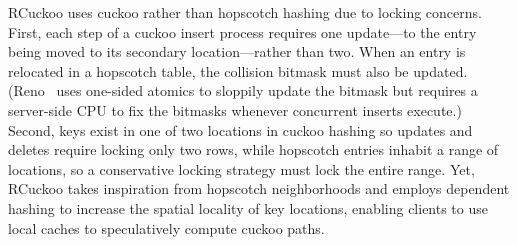 RCuckoo uses cuckoo rather than hopscotch hashing due to locking
concerns.
First, each step of a cuckoo insert process requires one update---to
the entry being moved to its secondary location---rather than two.
When an entry is relocated in a hopscotch table, the collision bitmask
must also be updated.  (Reno~\cite{reno} uses one-sided atomics to
sloppily update the bitmask but requires a server-side CPU to fix the
bitmasks whenever concurrent inserts execute.)  Second, keys exist in
one of two locations in cuckoo hashing so updates and deletes require
locking only two rows, while hopscotch entries inhabit a range of
locations, so a conservative locking strategy must lock the entire
range.  Yet, RCuckoo takes inspiration from hopscotch neighborhoods and employs dependent hashing to increase the spatial
locality of key locations, enabling clients to use local
caches to speculatively compute cuckoo paths.










